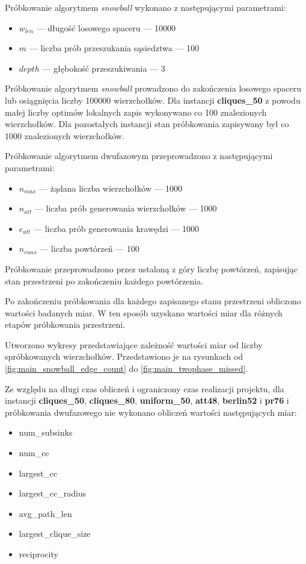 Próbkowanie algorytmem \textit{snowball} wykonano z następującymi parametrami:
\begin{itemize}
    \item $w_{len}$ --- długość losowego spaceru --- 10000
    \item $m$ --- liczba prób przeszukania sąsiedztwa --- 100
    \item $depth$ --- głębokość przeszukiwania --- 3
\end{itemize}

Próbkowanie algorytmem \textit{snowball} prowadzono do zakończenia losowego spaceru lub osiągnięcia liczby 100000 wierzchołków.
Dla instancji \textbf{cliques\_50} z powodu małej liczby optimów lokalnych zapis wykonywano co 100 znalezionych wierzchołków.
Dla pozostałych instancji stan próbkowania zapisywany był co 1000 znalezionych wierzchołków.

Próbkowanie algorytmem dwufazowym przeprowadzono z następującymi parametrami:
\begin{itemize}
    \item $n_{max}$ --- żądana liczba wierzchołków --- 1000
    \item $n_{att}$ --- liczba prób generowania wierzchołków --- 1000
    \item $e_{att}$ --- liczba prób generowania krawędzi --- 1000
    \item $n_{runs}$ --- liczba powtórzeń --- 100
\end{itemize}

Próbkowanie przeprowadzono przez ustaloną z góry liczbę powtórzeń, zapisując stan przestrzeni po zakończeniu każdego powtórzenia.

Po zakończeniu próbkowania dla każdego zapisanego stanu przestrzeni obliczono wartości badanych miar. W ten sposób uzyskano
wartości miar dla różnych etapów próbkowania przestrzeni.

Utworzono wykresy przedstawiające zależność wartości miar od liczby spróbkowanych wierzchołków.
Przedstawiono je na rysunkach od \ref{fig:main_snowball_edge_count} do \ref{fig:main_twophase_missed}.

Ze względu na długi czas obliczeń i ograniczony czas realizacji projektu,
dla instancji \textbf{cliques\_50}, \textbf{cliques\_80}, \textbf{uniform\_50}, \textbf{att48}, \textbf{berlin52} i \textbf{pr76} i próbkowania dwufazowego
nie wykonano obliczeń wartości następujących miar:

\begin{itemize}
    \item num\_subsinks
    \item num\_cc
    \item largest\_cc
    \item largest\_cc\_radius
    \item avg\_path\_len
    \item largest\_clique\_size
    \item reciprocity
\end{itemize}

